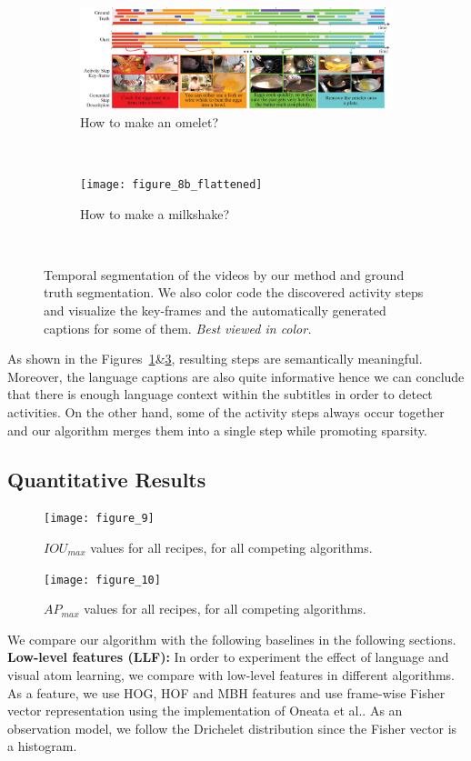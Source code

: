 \begin{figure}[ht]
  \begin{subfigure}[b]{\textwidth}
    \includegraphics[width=\textwidth]{figure_8a_flattened}
    \caption{How to make an omelet?}
    \label{recipe:ommelette}
  \end{subfigure}~
  \begin{subfigure}[b]{\textwidth}
    \texttt{[image: figure\_8b\_flattened]}
    \caption{How to make a milkshake?}
    \label{recipe:milkshake}
  \end{subfigure}~
\caption{Temporal segmentation of the videos by our method and ground truth segmentation. We also color code the discovered activity steps and visualize  the key-frames and the automatically generated captions for some of them. \emph{Best viewed in color.}}
\end{figure}

As shown in the Figures~\ref{recipe:ommelette}\&\ref{recipe:milkshake}, resulting steps are semantically meaningful. Moreover, the language captions are also quite informative hence we can conclude that there is enough language context within the subtitles in order to detect activities. On the other hand, some of the activity steps always occur together and our algorithm merges them into a single step while promoting sparsity.
\subsection{Quantitative Results}
\begin{figure}[t]
  \texttt{[image: figure\_9]}
  \caption{$IOU_{max}$ values for all recipes, for all competing algorithms.}
  \label{mIOU}
\texttt{[image: figure\_10]}
\caption{$AP_{max}$ values for all recipes, for all competing algorithms.}
\label{mmAP}
\end{figure}

We compare our algorithm with the following baselines in the following sections.
\noindent\textbf{Low-level features (LLF):}
In order to experiment the effect of language and visual atom learning, we compare with low-level features in different algorithms. As a feature, we use HOG, HOF and MBH features and use frame-wise Fisher vector representation using the implementation of Oneata et al.\cite{fastLaptev}. As an observation model, we follow the Drichelet distribution since the Fisher vector is a histogram.


